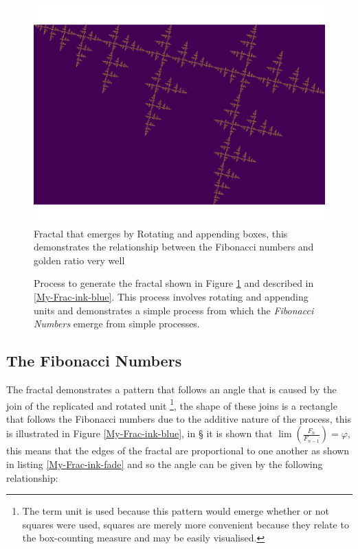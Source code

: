 \documentclass[a4paper,11pt,twoside]{article}
\begin{document}
\begin{figure}[htbp]
\centering
\includegraphics[width=.9\linewidth]{../Problems/fractal-dimensions/my-self-rep-frac-GR.png}
\caption{\label{My-Frac-GR-plot}Fractal that emerges by Rotating and appending boxes, this demonstrates the relationship between the Fibonacci numbers and golden ratio very well}
\end{figure}



\begin{figure}[htbp]
\centering

\caption{\label{My-Frac-progression-ink}Process to generate the fractal shown in Figure \ref{My-Frac-GR-plot} and described in \ref{My-Frac-ink-blue}. This process involves rotating and appending units and demonstrates a simple process from which the \emph{Fibonacci Numbers} emerge from simple processes.}
\end{figure}


\subsection{The Fibonacci Numbers}
\label{sec:orgac05939}

The fractal demonstrates a pattern that follows an angle that is caused by the
join of the replicated and rotated unit \footnote{The term unit is used because this pattern would emerge whether or not squares were used, squares are merely more convenient because they relate to the box-counting measure and may be easily visualised.}, the shape of these joins is a
rectangle that follows the Fibonacci numbers due to the additive nature of the
process, this is illustrated in Figure \ref{My-Frac-ink-blue}, in \S
it is shown that \(\lim
\left(\frac{F_{n}}{F_{n-1}}\right) = \varphi\), this means that the edges of the
fractal are proportional to one another as shown in listing \ref{My-Frac-ink-fade} and
so the angle can be given by the following relationship:
\end{document}
